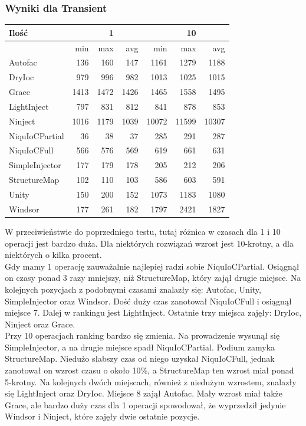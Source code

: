 \documentclass[12pt]{article}
\begin{document}
\subsubsection{Wyniki dla Transient}
\begin{center}
\begin{small}
	\begin{tabular}{ | l | r r r | r r r | }
    		\hline
Ilość & & 1 & & & 10 & \\ \hline
 & min & max & avg & min & max & avg \\ \hline
Autofac & 136 & 160 & 147 & 1161 & 1279 & 1188 \\ \hline
DryIoc & 979 & 996 & 982 & 1013 & 1025 & 1015 \\ \hline
Grace & 1413 & 1472 & 1426 & 1465 & 1558 & 1495 \\ \hline
LightInject & 797 & 831 & 812 & 841 & 878 & 853 \\ \hline
Ninject & 1016 & 1179 & 1039 & 10072 & 11599 & 10307 \\ \hline
NiquIoCPartial & 36 & 38 & 37 & 285 & 291 & 287 \\ \hline
NiquIoCFull & 566 & 576 & 569 & 619 & 661 & 631 \\ \hline
SimpleInjector & 177 & 179 & 178 & 205 & 212 & 206 \\ \hline
StructureMap & 102 & 110 & 103 & 586 & 603 & 591 \\ \hline
Unity & 150 & 200 & 152 & 1073 & 1183 & 1080 \\ \hline
Windsor & 177 & 261 & 182 & 1797 & 2421 & 1827 \\ \hline
  	\end{tabular}
\end{small}
\end{center}
W przeciwieństwie do poprzedniego testu, tutaj różnica w czasach dla 1 i 10 operacji jest bardzo duża. Dla niektórych rozwiązań wzrost jest 10-krotny, a dla niektórych o kilka procent.\\
Gdy mamy 1 operację zauważalnie najlepiej radzi sobie NiquIoCPartial. Osiągnął on czasy ponad 3 razy mniejszy, niż StructureMap, który zajął drugie miejsce. Na kolejnych pozycjach z podobnymi czasami znalazły się: Autofac, Unity, SimpleInjector oraz Windsor. Dość duży czas zanotował NiquIoCFull i osiągnął miejsce 7. Dalej w rankingu jest LightInject. Ostatnie trzy miejsca zajęły: DryIoc, Ninject oraz Grace.\\
Przy 10 operacjach ranking bardzo się zmienia. Na prowadzenie wysunął się SimpleInjector, a na drugie miejsce spadł NiquIoCPartial. Podium zamyka StructureMap. Niedużo słabszy czas od niego uzyskał NiquIoCFull, jednak zanotował on wzrost czasu o około 10\%, a StructureMap ten wzrost miał ponad 5-krotny. Na kolejnych dwóch miejscach, również z niedużym wzrostem, znalazły się LightInject oraz DryIoc. Miejsce 8 zajął Autofac. Mały wzrost miał także Grace, ale bardzo duży czas dla 1 operacji spowodował, że wyprzedził jedynie Windsor i Ninject, które zajęły dwie ostatnie pozycje.
\end{document}
